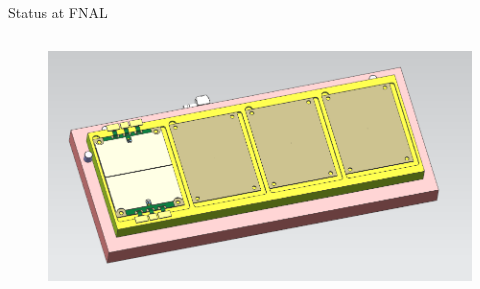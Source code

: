 \documentclass[english,aspectratio=43,8pt]{beamer}
\newcommand{\backupbegin}{%
   \newcounter{finalframe}
   \setcounter{finalframe}{\value{framenumber}}
}
\newcommand{\backupend}{%
   \setcounter{framenumber}{\value{finalframe}}
}
\begin{document}
\begin{frame}{Status at FNAL}
\begin{columns}
\begin{column}{0.5\textwidth}
\begin{figure}
        \end{figure}
        \begin{figure}
            \includegraphics[width=\textwidth]{figures/ETL_single_assychuck2.png}
        \end{figure}
    \end{column}
  \end{columns}
\end{frame}






\end{document}
